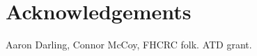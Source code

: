 \documentclass{amsart}
\newcommand{\forarxiv}[1]{#1}
\newcommand{\notforarxiv}[1]{}
\newcommand{\FIGmassTransport}{\
\begin{figure}[ht]
\begin{center}
  \forarxiv{\texttt{[image: mass\_transport.pdf]}}
\end{center}
\caption{\
  Caption goes here.
}
\label{FIGmassTransport}
\end{figure}
}
\begin{document}
\section{Acknowledgements}
Aaron Darling, Connor McCoy,
FHCRC folk.
ATD grant.


\notforarxiv{
\newpage
\section{Figure Legends}
\clearpage

\newpage
}



\end{document}

